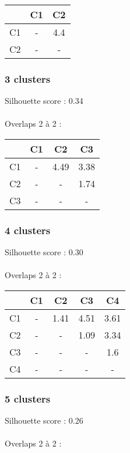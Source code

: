 \documentclass{article}
\begin{document}
\begin{tabular}{|c|c|c|}
\hline
& C1 & C2 \\
\hline
C1 & - & 4.4 \\
\hline
C2 & - & - \\  
\hline
\end{tabular} 

\subsubsection*{3 clusters}

Silhouette score : 0.34 \\\\
Overlaps 2 à 2 :\\

\begin{tabular}{|c|c|c|c|}
\hline
& C1 & C2 & C3 \\
\hline
C1 & - & 4.49 & 3.38 \\
\hline
C2 & - & - & 1.74 \\
\hline
C3 & - & - & - \\   
\hline
\end{tabular} 

\subsubsection*{4 clusters}

Silhouette score : 0.30 \\\\
Overlaps 2 à 2 :\\

\begin{tabular}{|c|c|c|c|c|}
\hline
& C1 & C2 & C3 & C4 \\
\hline
C1 & - & 1.41 & 4.51 & 3.61 \\
\hline
C2 & - & - & 1.09 & 3.34 \\
\hline
C3 & - & - & - & 1.6 \\
\hline
C4 & - & - & - & - \\
\hline
\end{tabular}

\subsubsection*{5 clusters}

Silhouette score : 0.26 \\\\
Overlaps 2 à 2 :\\
\end{document}
